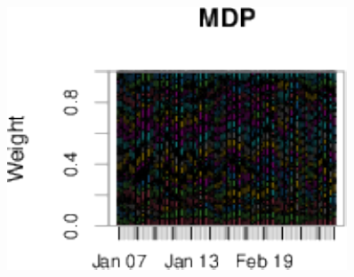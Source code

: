\documentclass[11pt,preprint]{elsarticle}
\let\origfigure\figure
\let\endorigfigure\endfigure
\renewenvironment{figure}[1][2] {
    \expandafter\origfigure\expandafter[H]
} {
    \endorigfigure
}
\numberwithin{equation}{section}
\numberwithin{figure}{section}
\numberwithin{table}{section}
\begin{document}
\begin{figure}[H]

{\centering \includegraphics{Essay_files/figure-latex/Figure 4-4} 

}

\caption{Drawdowns \label{Figure4}}\label{fig:Figure 4-4}
\end{figure}
\end{document}
